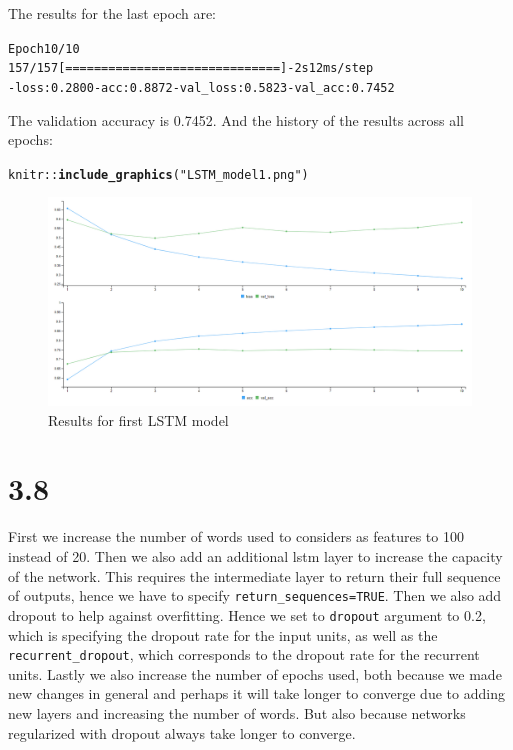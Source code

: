\documentclass[10pt, a4paper, english]{article}\usepackage[]{graphicx}\usepackage[dvipsnames]{xcolor}
\makeatletter
\def\maxwidth{ %
  \ifdim\Gin@nat@width>\linewidth
    \linewidth
  \else
    \Gin@nat@width
  \fi
}
\newcommand{\hlstr}[1]{\textcolor[rgb]{0.192,0.494,0.8}{#1}}%
\newcommand{\hlopt}[1]{\textcolor[rgb]{0,0,0}{#1}}%
\newcommand{\hlstd}[1]{\textcolor[rgb]{0.345,0.345,0.345}{#1}}%
\newcommand{\hlkwd}[1]{\textcolor[rgb]{0.737,0.353,0.396}{\textbf{#1}}}%
\newenvironment{kframe}{%
 \def\at@end@of@kframe{}%
 \ifinner\ifhmode%
  \def\at@end@of@kframe{\end{minipage}}%
  \begin{minipage}{\columnwidth}%
 \fi\fi%
 \def\FrameCommand##1{\hskip\@totalleftmargin \hskip-\fboxsep
 \colorbox{shadecolor}{##1}\hskip-\fboxsep
     \hskip-\linewidth \hskip-\@totalleftmargin \hskip\columnwidth}%
 \MakeFramed {\advance\hsize-\width
   \@totalleftmargin\z@ \linewidth\hsize
   \@setminipage}}%
 {\par\unskip\endMakeFramed%
 \at@end@of@kframe}
\newenvironment{knitrout}{}{} %
\makeatother
\begin{document}
The results for the last epoch are:
\begin{knitrout}
\color{fgcolor}\begin{kframe}
\begin{alltt}
Epoch 10/10
157/157 [==============================] - 2s 12ms/step 
- loss: 0.2800 - acc: 0.8872 - val_loss: 0.5823 - val_acc: 0.7452
\end{alltt}
\end{kframe}
\end{knitrout}
The validation accuracy is 0.7452.
And the history of the results across all epochs:
\begin{knitrout}
\color{fgcolor}\begin{kframe}
\begin{alltt}
\hlstd{knitr}\hlopt{::}\hlkwd{include_graphics}\hlstd{(}\hlstr{"LSTM_model1.png"}\hlstd{)}
\end{alltt}
\end{kframe}\begin{figure}
\includegraphics[width=\maxwidth]{LSTM_model1} \caption[Results for first LSTM model]{Results for first LSTM model}\label{fig:unnamed-chunk-23}
\end{figure}

\end{knitrout}

\section{3.8}
First we increase the number of words used to considers as features to 100 instead of 20. Then we also add an additional lstm layer to increase the capacity of the network. This requires the intermediate layer to return their full sequence of outputs, hence we have to specify \texttt{return\_sequences=TRUE}. Then we also add dropout to help against overfitting. Hence we set to \texttt{dropout} argument to 0.2, which is specifying the dropout rate for the input units, as well as the \texttt{recurrent\_dropout}, which corresponds to the dropout rate for the recurrent units. Lastly we also increase the number of epochs used, both because we made new changes in general and perhaps it will take longer to converge due to adding new layers and increasing the number of words. But also because networks regularized with dropout always take longer to converge. 
\end{document}

